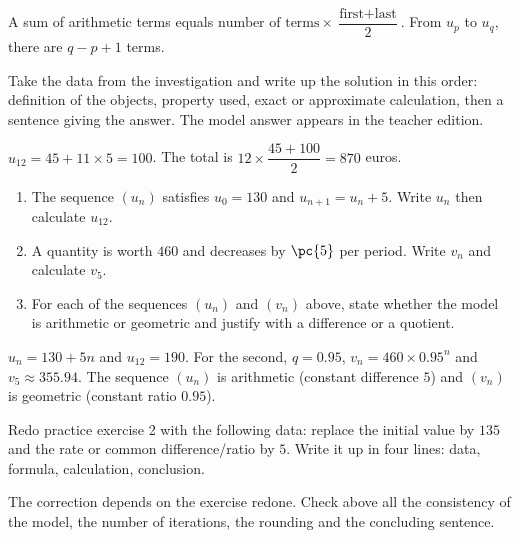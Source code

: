 \begin{summary}A sum of arithmetic terms equals $\text{number of terms}\times\dfrac{\text{first}+\text{last}}2$. From $u_p$ to $u_q$, there are $q-p+1$ terms.\end{summary}

\begin{example}
Take the data from the investigation and write up the solution in this order: definition of the objects, property used, exact or approximate calculation, then a sentence giving the answer. The model answer appears in the teacher edition.
\end{example}
\begin{solution}$u_{12}=45+11\times5=100$. The total is $12\times\dfrac{45+100}{2}=870$ euros.\end{solution}

\begin{exercise}[essential]
\begin{enumerate}\item The sequence $(u_n)$ satisfies $u_0=130$ and $u_{n+1}=u_n+5$. Write $u_n$ then calculate $u_{12}$.\item A quantity is worth $460$ and decreases by $\pc{5}$ per period. Write $v_n$ and calculate $v_5$.\item For each of the sequences $(u_n)$ and $(v_n)$ above, state whether the model is arithmetic or geometric and justify with a difference or a quotient.\end{enumerate}
\end{exercise}
\begin{solution}$u_n=130+5n$ and $u_{12}=190$. For the second, $q=\num{0,95}$, $v_n=460\times\num{0,95}^n$ and $v_5\approx\num{355,94}$. The sequence $(u_n)$ is arithmetic (constant difference $5$) and $(v_n)$ is geometric (constant ratio $\num{0,95}$).\end{solution}


\begin{homework}Redo practice exercise 2 with the following data: replace the initial value by $135$ and the rate or common difference/ratio by $5$. Write it up in four lines: data, formula, calculation, conclusion.\end{homework}
\begin{solution}The correction depends on the exercise redone. Check above all the consistency of the model, the number of iterations, the rounding and the concluding sentence.\end{solution}

